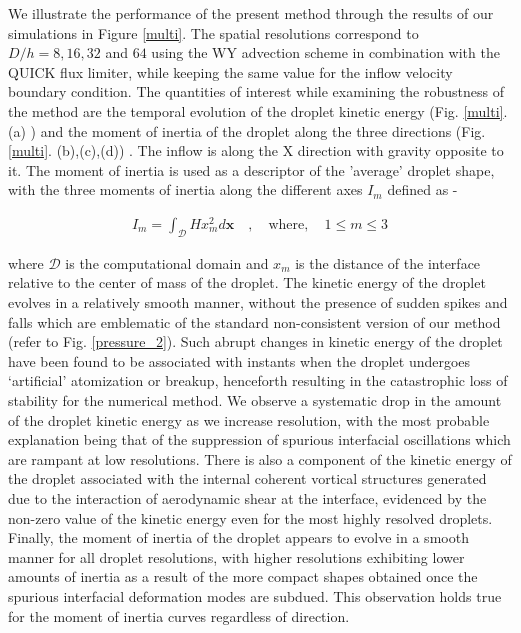 We illustrate the performance of the present method through the 
results of our simulations in Figure \ref{multi}. 
The spatial resolutions correspond to $D/h = 8, 16, 32 $ and $64$ 
using the WY advection scheme in combination with the QUICK flux limiter, 
while keeping the same value for the inflow velocity boundary condition. 
The quantities of interest while examining the robustness of the 
method are the temporal evolution of the droplet kinetic energy 
(Fig. \ref{multi}. (a) ) and the moment of inertia of the droplet 
along the three directions (Fig. \ref{multi}. (b),(c),(d)) . 
The inflow is along the X direction with gravity opposite to it. 
The moment of inertia is used as a descriptor of the 'average' droplet shape, 
with the three moments of inertia along the different axes $I_m$ defined as - 


\begin{align}
	I_m = \int_{\mathcal{D}} H x_m^2 d \boldsymbol{x} \quad , \quad \text{where}, \quad 1 \le m \le 3
\end{align}

where $\mathcal{D}$ is the computational domain and $x_m$ is the 
distance of the interface relative to the center of mass of the droplet.   
The kinetic energy of the droplet evolves in a relatively smooth manner, 
without the presence of sudden spikes and falls which are emblematic of 
the standard non-consistent version of our method (refer to Fig. \ref{pressure_2}). 
Such abrupt changes in kinetic energy of the droplet have been 
found to be associated with instants when the droplet undergoes 
`artificial' atomization or breakup, henceforth resulting in 
the catastrophic loss of stability for the numerical method. 
We observe a systematic drop in the amount of the droplet 
kinetic energy as we increase resolution, with the most probable explanation 
being that of the suppression of spurious interfacial 
oscillations which are rampant at low resolutions. 
There is also a component of the kinetic energy of the droplet 
associated with the internal coherent vortical structures generated due to 
the interaction of aerodynamic shear at the interface, 
evidenced by the non-zero value of the kinetic 
energy even for the most highly resolved droplets. 
Finally, the moment of inertia of the droplet appears to evolve 
in a smooth manner for all droplet resolutions, with higher 
resolutions exhibiting lower amounts of inertia as a result of 
the more compact shapes obtained once the 
spurious interfacial deformation modes are subdued. 
This observation holds true for the moment of inertia curves regardless of direction.           


